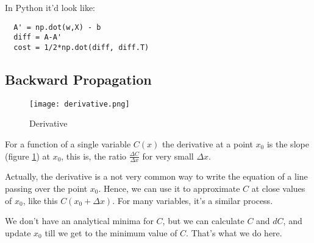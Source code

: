 In Python it'd look like:
\begin{center}
  \begin{BVerbatim}
  A' = np.dot(w,X) - b
  diff = A-A' 
  cost = 1/2*np.dot(diff, diff.T)
  \end{BVerbatim}
\end{center}





\subsection{Backward Propagation}
\begin{figure}
  \centering
  \texttt{[image: derivative.png]}
  \caption{Derivative}\label{fig:basics}
\end{figure}

For a function of a single variable $C(x)$ the derivative at a point $x_0$ is the slope (figure \ref{fig:basics}) at $x_0$, this is, the ratio $\frac{\Delta C}{\Delta x}$ for very small $\Delta x$.

Actually, the derivative is a not very common way to write the equation of a line passing over the point $x_0$. Hence, we can use it to approximate $C$ at close values of $x_0$, like this $C(x_0 + \Delta x)$. For many variables, it's a similar process.

We don't have an analytical minima for $C$, but we can calculate $C$ and $dC$, and update $x_0$ till we get to the minimum value of $C$. That's what we do here.

